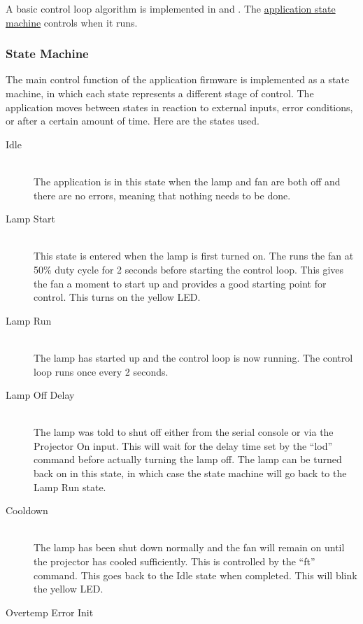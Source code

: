 \documentclass{article}
\begin{document}
A basic control loop algorithm is implemented in  and
.  The \hyperref[sssec:FWAppStateMachine]{application state machine} controls when
it runs.

\subsubsection{State Machine} \label{sssec:FWAppStateMachine}
The main control function of the application firmware is implemented as a state machine, in which
each state represents a different stage of control.  The application moves between states in
reaction to external inputs, error conditions, or after a certain amount of time.  Here are the
states used.

\begin{description}
  \item[Idle] \hfill \\
    The application is in this state when the lamp and fan are both off and there are no errors,
    meaning that nothing needs to be done.
  \item[Lamp Start] \hfill \\
    This state is entered when the lamp is first turned on.  The runs the fan at 50\% duty cycle for
    2 seconds before starting the control loop.  This gives the fan a moment to start up and
    provides a good starting point for control.  This turns on the yellow LED.
  \item[Lamp Run] \hfill \\
    The lamp has started up and the control loop is now running.  The control loop runs once every 2
    seconds.
  \item[Lamp Off Delay] \hfill \\
    The lamp was told to shut off either from the serial console or via the Projector On input.
    This will wait for the delay time set by the ``lod'' command before actually turning the lamp
    off.  The lamp can be turned back on in this state, in which case the state machine will go back
    to the Lamp Run state.
  \item[Cooldown] \hfill \\
    The lamp has been shut down normally and the fan will remain on until the projector has cooled
    sufficiently.  This is controlled by the ``ft'' command.  This goes back to the Idle state when
    completed.  This will blink the yellow LED.
  \item[Overtemp Error Init] \hfill \\

\end{description}
\end{document}
